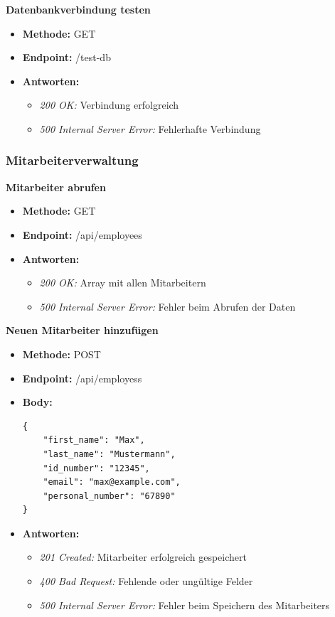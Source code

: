 \textbf{Datenbankverbindung testen}
\begin{itemize}
    \item \textbf{Methode: }GET 
    \item \textbf{Endpoint: }/test-db
    \item \textbf{Antworten: }
    \begin{itemize}
        \item \textit{200 OK: }Verbindung erfolgreich
        \item \textit{500 Internal Server Error: }Fehlerhafte Verbindung
    \end{itemize}
\end{itemize}


\subsubsection{Mitarbeiterverwaltung}

\textbf{Mitarbeiter abrufen}
\begin{itemize}
    \item \textbf{Methode: }GET 
    \item \textbf{Endpoint: }/api/employees
    \item \textbf{Antworten: }
    \begin{itemize}
        \item \textit{200 OK: }Array mit allen Mitarbeitern
        \item \textit{500 Internal Server Error: }Fehler beim Abrufen der Daten
    \end{itemize}
\end{itemize}

\textbf{Neuen Mitarbeiter hinzufügen}
\begin{itemize}
    \item \textbf{Methode: }POST 
    \item \textbf{Endpoint: }/api/employess  
    \item \textbf{Body: } \begin{verbatim}
{
    "first_name": "Max",
    "last_name": "Mustermann",
    "id_number": "12345",
    "email": "max@example.com",
    "personal_number": "67890"
}
    \end{verbatim}
    \item \textbf{Antworten: }
    \begin{itemize}
        \item \textit{201 Created: }Mitarbeiter erfolgreich gespeichert
        \item \textit{400 Bad Request: }Fehlende oder ungültige Felder
        \item \textit{500 Internal Server Error: }Fehler beim Speichern des Mitarbeiters
    \end{itemize}
\end{itemize}


